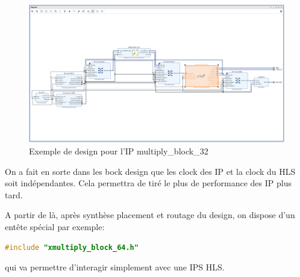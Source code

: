 \documentclass[12pt,a4paper]{ieee}
\begin{document}
\begin{figure}[H]
	\centering
		\includegraphics[width=\linewidth]{im/ip3.png}	
	\caption{Exemple de design pour l'IP multiply\_block\_32}
	\label{fig-ip}
\end{figure}
On a fait en sorte dans les bock design que les clock des IP et la clock du HLS soit indépendantes. Cela permettra de tiré le plus de performance des IP plus tard.


A partir de là, après synthèse placement et routage du design, on dispose d'un entête spécial par exemple:
\begin{lstlisting}[language=C]
#include "xmultiply_block_64.h"
\end{lstlisting}
qui va permettre d'interagir simplement avec une IPS HLS.\\
\end{document}
